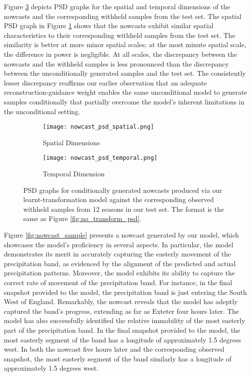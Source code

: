 \documentclass[ oneside,%
                    author={George Herbert},
                    degree={MSci},
                     title={Diffusion Models for Time-Evolving Precipitation Fields},
                  subtitle={}]{dissertation}
\begin{document}
Figure \ref{fig:nowcast_psd} depicts PSD graphs for the spatial and temporal dimensions of the nowcasts and the corresponding withheld samples from the test set. The spatial PSD graph in Figure \ref{fig:nowcast_psd_spatial} shows that the nowcasts exhibit similar spatial characteristics to their corresponding withheld samples from the test set. The similarity is better at more minor spatial scales; at the most minute spatial scale, the difference in power is negligible. At all scales, the discrepancy between the nowcasts and the withheld samples is less pronounced than the discrepancy between the unconditionally generated samples and the test set. The consistently lesser discrepancy reaffirms our earlier observation that an adequate reconstruction-guidance weight enables the same unconditional model to generate samples conditionally that partially overcome the model's inherent limitations in the unconditional setting. 

\begin{figure}[htbp]
      \centering
      \begin{subfigure}{.47\textwidth}
            \texttt{[image: nowcast\_psd\_spatial.png]}
            \caption{Spatial Dimensions}
            \label{fig:nowcast_psd_spatial}
      \end{subfigure}
      \begin{subfigure}{.51\textwidth}
            \texttt{[image: nowcast\_psd\_temporal.png]}
            \caption{Temporal Dimension}
            \label{fig:nowcast_psd_temporal}
      \end{subfigure}
      \caption{PSD graphs for conditionally generated nowcasts produced via our learnt-transformation model against the corresponding observed withheld samples from 12 seasons in our test set. The format is the same as Figure \ref{fig:no_transform_psd}.}
      \label{fig:nowcast_psd}
\end{figure}

Figure \ref{fig:nowcast_sample} presents a nowcast generated by our model, which showcases the model's proficiency in several aspects. In particular, the model demonstrates its merit in accurately capturing the easterly movement of the precipitation band, as evidenced by the alignment of the predicted and actual precipitation patterns. Moreover, the model exhibits its ability to capture the correct rate of movement of the precipitation band. For instance, in the final snapshot provided to the model, the precipitation band is just entering the South West of England. Remarkably, the nowcast reveals that the model has adeptly captured the band's progress, extending as far as Exteter four hours later. The model has also successfully identified the relative immobility of the most easterly part of the precipitation band. In the final snapshot provided to the model, the most easterly segment of the band has a longitude of approximately 1.5 degrees west. In both the nowcast five hours later and the corresponding observed snapshot, the most easterly segment of the band similarly has a longitude of approximately 1.5 degrees west.
\end{document}
